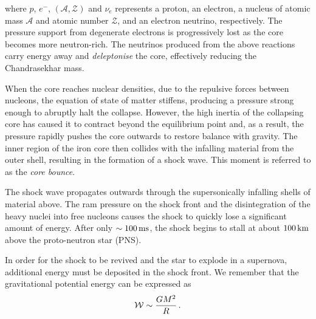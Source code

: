 where \(p\), \(e^{-}\), \((\mathcal{A}, \mathcal{Z})\) and \(\nu_e\) represents a proton, an electron, a nucleus of atomic mass \(\mathcal{A}\) and atomic number \(\mathcal{Z}\), and an electron neutrino, respectively. The pressure support from degenerate electrons is progressively lost as the core becomes more neutron-rich. The neutrinos produced from the above reactions carry energy away and \emph{deleptonise} the core, effectively reducing the Chandrasekhar mass.



When the core reaches nuclear densities, due to the repulsive forces between nucleons, the equation of state of matter stiffens, producing a pressure strong enough to abruptly halt the collapse. However, the high inertia of the collapsing core has caused it to contract beyond the equilibrium point and, as a result, the pressure rapidly pushes the core outwards to restore balance with gravity. The inner region of the iron core then collides with the infalling material from the outer shell, resulting in the formation of a shock wave. This moment is referred to as the \emph{core bounce}.

The shock wave propagates outwards through the supersonically infalling shells of material above. The ram pressure on the shock front and the disintegration of the heavy nuclei into free nucleons causes the shock to quickly lose a significant amount of energy. After only \(\sim100\,\mathrm{ms}\), the shock begins to stall at about \(100\,\mathrm{km}\) above the proto-neutron star (PNS).

In order for the shock to be revived and the star to explode in a supernova, additional energy must be deposited in the shock front. We remember that the gravitational potential energy can be expressed as
\begin{equation}
    \mathcal{W} \sim \frac{GM^2}{R} \,\mathrm{.}
\end{equation}

